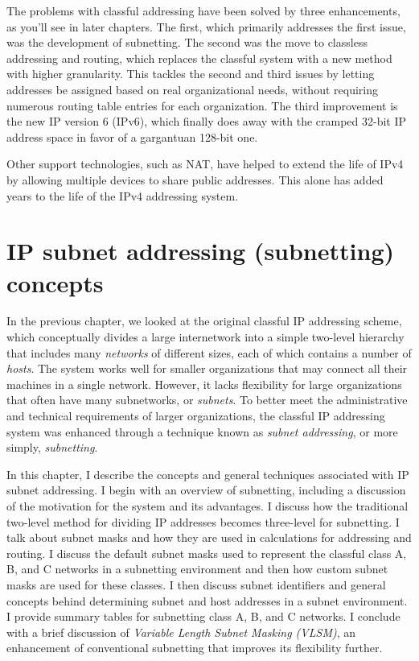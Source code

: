 \documentclass[b5paper,11pt]{memoir}
\begin{document}
The problems with classful addressing have been solved by three
enhancements, as you'll see in later chapters. The first, which
primarily addresses the first issue, was the development of subnetting.
The second was the move to classless addressing and routing, which
replaces the classful system with a new method with higher granularity.
This tackles the second and third issues by letting addresses be
assigned based on real organizational needs, without requiring numerous
routing table entries for each organization. The third improvement is
the new IP version 6 (IPv6), which finally does away with the cramped
32-bit IP address space in favor of a gargantuan 128-bit one.

Other support technologies, such as NAT, have helped to extend the life
of IPv4 by allowing multiple devices to share public addresses. This
alone has added years to the life of the IPv4 addressing system.


\chapter{IP subnet addressing (subnetting) concepts}

In the previous chapter, we looked at the original classful IP
addressing scheme, which conceptually divides a large internetwork into
a simple two-level hierarchy that includes many {\emph{networks}} of
different sizes, each of which contains a number of {\emph{hosts}}. The
system works well for smaller organizations that may connect all their
machines in a single network. However, it lacks flexibility for large
organizations that often have many subnetworks, or {\emph{subnets}}. To
better meet the administrative and technical requirements of larger
organizations, the classful IP addressing system was enhanced through a
technique known as {\emph{subnet addressing}}, or more simply,
\protect\hypertarget{ch18.htmlux5cux23idx-CHP-18-0717}{}{}{\emph{subnetting}}.

In this chapter, I describe the concepts and general techniques
associated with IP subnet addressing. I begin with an overview of
subnetting, including a discussion of the motivation for the system and
its advantages. I discuss how the traditional two-level method for
dividing IP addresses becomes three-level for subnetting. I talk about
subnet masks and how they are used in calculations for addressing and
routing. I discuss the default subnet masks used to represent the
classful class A, B, and C networks in a subnetting environment and then
how custom subnet masks are used for these classes. I then discuss
subnet identifiers and general concepts behind determining subnet and
host addresses in a subnet environment. I provide summary tables for
\protect\hypertarget{ch18.htmlux5cux23idx-CHP-18-0718}{}{}subnetting
class A, B, and C networks. I conclude with a brief discussion of
{\emph{Variable Length Subnet Masking (VLSM)}}, an enhancement of
conventional subnetting that improves its flexibility further.
\end{document}
